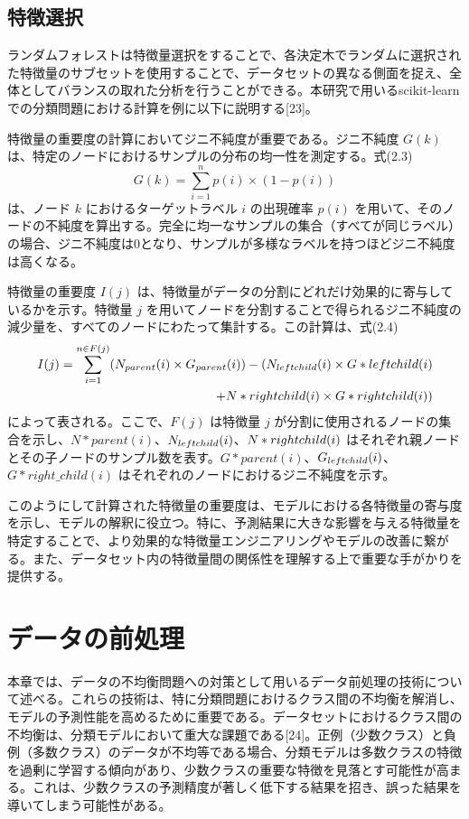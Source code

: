\documentclass[platex]{suribt}
\begin{document}
\subsection{特徴選択}
ランダムフォレストは特徴量選択をすることで、各決定木でランダムに選択された特徴量のサブセットを使用することで、データセットの異なる側面を捉え、全体としてバランスの取れた分析を行うことができる。本研究で用いるscikit-learnでの分類問題における計算を例に以下に説明する[23]。

特徴量の重要度の計算においてジニ不純度が重要である。ジニ不純度 \( G(k) \) は、特定のノードにおけるサンプルの分布の均一性を測定する。式(2.3)
\begin{equation}
G(k) = \sum_{i=1}^{n} p(i) \times (1-p(i))
\end{equation}
は、ノード \( k \) におけるターゲットラベル \( i \) の出現確率 \( p(i) \) を用いて、そのノードの不純度を算出する。完全に均一なサンプルの集合（すべてが同じラベル）の場合、ジニ不純度は0となり、サンプルが多様なラベルを持つほどジニ不純度は高くなる。

特徴量の重要度 \( I(j) \) は、特徴量がデータの分割にどれだけ効果的に寄与しているかを示す。特徴量 \( j \) を用いてノードを分割することで得られるジニ不純度の減少量を、すべてのノードにわたって集計する。この計算は、式(2.4)
\begin{equation}
\begin{split}
I(j) = \sum_{i=1}^{n \in F(j)} (N_{parent}(i) \times G_{parent}(i)) - (N_{left\*child}(i) \times G*{left\*child}(i) \\ + N*{right\*child}(i) \times G*{right\*child}(i))
\end{split}
\end{equation}
によって表される。ここで、\( F(j) \) は特徴量 \( j \) が分割に使用されるノードの集合を示し、\( N*{parent}(i) \)、\( N_{left\*child}(i) \)、\( N*{right\*child}(i) \) はそれぞれ親ノードとその子ノードのサンプル数を表す。\( G*{parent}(i) \)、\( G_{left\*child}(i) \)、\( G*{right\_child}(i) \) はそれぞれのノードにおけるジニ不純度を示す。

このようにして計算された特徴量の重要度は、モデルにおける各特徴量の寄与度を示し、モデルの解釈に役立つ。特に、予測結果に大きな影響を与える特徴量を特定することで、より効果的な特徴量エンジニアリングやモデルの改善に繋がる。また、データセット内の特徴量間の関係性を理解する上で重要な手がかりを提供する。
\section{データの前処理}
本章では、データの不均衡問題への対策として用いるデータ前処理の技術について述べる。これらの技術は、特に分類問題におけるクラス間の不均衡を解消し、モデルの予測性能を高めるために重要である。データセットにおけるクラス間の不均衡は、分類モデルにおいて重大な課題である[24]。正例（少数クラス）と負例（多数クラス）のデータが不均等である場合、分類モデルは多数クラスの特徴を過剰に学習する傾向があり、少数クラスの重要な特徴を見落とす可能性が高まる。これは、少数クラスの予測精度が著しく低下する結果を招き、誤った結果を導いてしまう可能性がある。
\end{document}
